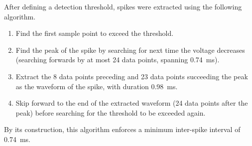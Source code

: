 After defining a detection threshold, spikes were extracted using the following algorithm.
\begin{enumerate}
\item Find the first sample point to exceed the threshold.
\item Find the peak of the spike by searching for next time the voltage decreases (searching forwards by at most 24 data points, spanning \SI{0.74}{\milli\second}).
\item Extract the 8 data points preceding and 23 data points succeeding the peak as the waveform of the spike, with duration \SI{0.98}{\milli\second}.
\item Skip forward to the end of the extracted waveform (24 data points after the peak) before searching for the threshold to be exceeded again.
\end{enumerate}
By its construction, this algorithm enforces a minimum inter-spike interval of \SI{0.74}{\milli\second}.
